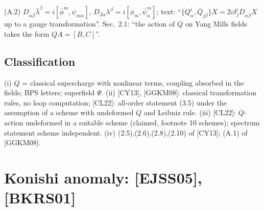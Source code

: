 \documentclass[10pt]{article}
\begin{document}
(A.2) $D_{\alpha\dot\beta}\bar\lambda^{\dot\beta}=i[\bar\phi^m,\psi_{m\alpha}]$, $D_{\beta\dot\alpha}\lambda^\beta=i[\phi_m,\bar\psi^m_{\dot\alpha}]$; text: ``$\{Q^i_\alpha,\bar Q_{j\dot\beta}\}X=2i\delta^i_jD_{\alpha\dot\beta}X$ up to a gauge transformation''. Sec.\ 2.1: ``the action of $Q$ on Yang Mills fields takes the form $QA=[B,C]$''.

\subsection{Classification}
(i) $Q$ = classical supercharge with nonlinear terms, coupling absorbed in the fields; BPS letters; superfield $\Psi$. (ii) [CY13], [GGKM08]: classical transformation rules, no loop computation; [CL22]: all-order statement (3.5) under the assumption of a scheme with undeformed $Q$ and Leibniz rule. (iii) [CL22]: $Q$-action undeformed in a suitable scheme (claimed, footnote 10 schemes); spectrum statement scheme independent. (iv) (2.5),(2.6),(2.8),(2.10) of [CY13]; (A.1) of [GGKM08].

\section{Konishi anomaly: [EJSS05], [BKRS01]}
\end{document}
